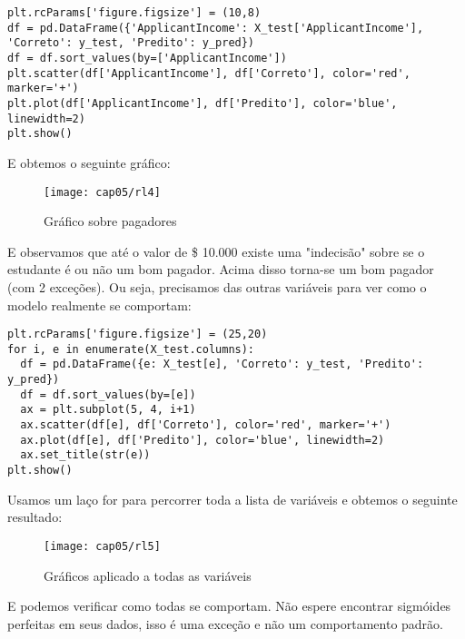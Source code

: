 \begin{lstlisting}[]
plt.rcParams['figure.figsize'] = (10,8)
df = pd.DataFrame({'ApplicantIncome': X_test['ApplicantIncome'], 'Correto': y_test, 'Predito': y_pred})
df = df.sort_values(by=['ApplicantIncome'])
plt.scatter(df['ApplicantIncome'], df['Correto'], color='red', marker='+')
plt.plot(df['ApplicantIncome'], df['Predito'], color='blue', linewidth=2)
plt.show()
\end{lstlisting}

E obtemos o seguinte gráfico:
\begin{figure}[H]
	\centering
	\texttt{[image: cap05/rl4]}
	\caption{Gráfico sobre pagadores}
\end{figure}

E observamos que até o valor de \$ 10.000 existe uma "indecisão" sobre se o estudante é ou não um bom pagador. Acima disso torna-se um bom pagador (com 2 exceções). Ou seja, precisamos das outras variáveis para ver como o modelo realmente se comportam:
\begin{lstlisting}[]
plt.rcParams['figure.figsize'] = (25,20)
for i, e in enumerate(X_test.columns):
  df = pd.DataFrame({e: X_test[e], 'Correto': y_test, 'Predito': y_pred})
  df = df.sort_values(by=[e])
  ax = plt.subplot(5, 4, i+1)
  ax.scatter(df[e], df['Correto'], color='red', marker='+')
  ax.plot(df[e], df['Predito'], color='blue', linewidth=2)
  ax.set_title(str(e))
plt.show()
\end{lstlisting}

Usamos um laço for para percorrer toda a lista de variáveis e obtemos o seguinte resultado:
\begin{figure}[H]
	\centering
	\texttt{[image: cap05/rl5]}
	\caption{Gráficos aplicado a todas as variáveis}
\end{figure}

E podemos verificar como todas se comportam. Não espere encontrar sigmóides perfeitas em seus dados, isso é uma exceção e não um comportamento padrão.
\clearpage
 